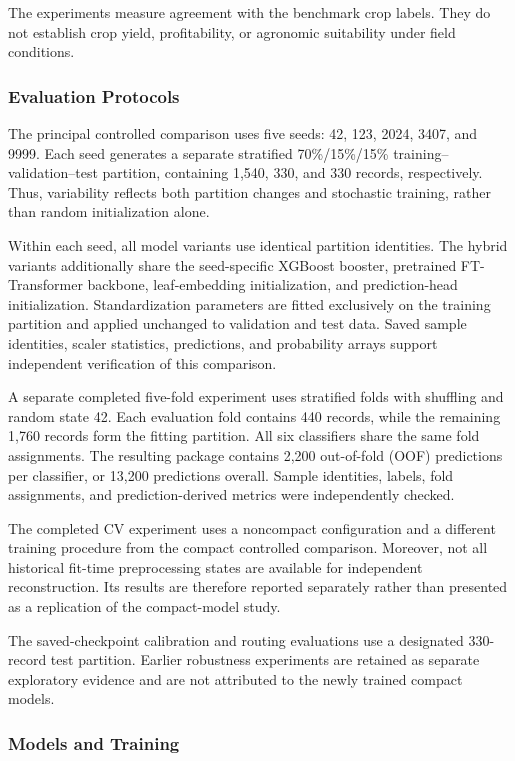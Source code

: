 The experiments measure agreement with the benchmark crop labels.
They do not establish crop yield, profitability, or agronomic
suitability under field conditions.

\subsubsection{Evaluation Protocols}

The principal controlled comparison uses five seeds:
42, 123, 2024, 3407, and 9999. Each seed generates a separate
stratified 70\%/15\%/15\% training--validation--test partition,
containing 1,540, 330, and 330 records, respectively.
Thus, variability reflects both partition changes and stochastic
training, rather than random initialization alone.

Within each seed, all model variants use identical partition
identities. The hybrid variants additionally share the seed-specific
XGBoost booster, pretrained FT-Transformer backbone, leaf-embedding
initialization, and prediction-head initialization. Standardization
parameters are fitted exclusively on the training partition and applied
unchanged to validation and test data. Saved sample identities,
scaler statistics, predictions, and probability arrays support
independent verification of this comparison.

A separate completed five-fold experiment uses
stratified folds with shuffling and random state 42.
Each evaluation fold contains 440 records, while the remaining
1,760 records form the fitting partition. All six classifiers share
the same fold assignments. The resulting package contains
2,200 out-of-fold (OOF) predictions per classifier, or
13,200 predictions overall. Sample identities, labels, fold
assignments, and prediction-derived metrics were independently checked.

The completed CV experiment uses a noncompact configuration and a
different training procedure from the compact controlled comparison.
Moreover, not all historical fit-time preprocessing states are
available for independent reconstruction. Its results are therefore
reported separately rather than presented as a replication of the
compact-model study.

The saved-checkpoint calibration and routing evaluations use a
designated 330-record test partition. Earlier robustness experiments
are retained as separate exploratory evidence and are not attributed
to the newly trained compact models.

\subsubsection{Models and Training}

